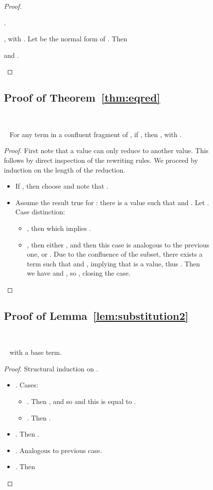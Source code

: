\documentclass{LMCS}
\makeatletter
\newcommand{\recap}[2]{\medskip\noindent{\bf #1 \ref{#2}.}~}
\def\mynobreakpar{\par\nobreak\@afterheading}
\makeatother
\begin{document}
\begin{figure}
{\begin{proof}
\begin{myenumerate}
\begin{itemize}
	  
	  
	  
	  
	  .
      \end{itemize}

    \item , with . Let  be the normal form of . Then
      
      
      and
      .
      \qedhere
  \end{myenumerate}
\end{proof}

\subsection{Proof of Theorem~\ref{thm:eqred}}\label{proof:eqred}~
\mynobreakpar
\recap{Theorem}{thm:eqred}
For any term  in a confluent fragment of , if , then , with .
\begin{proof}
  First note that a value can only reduce to another value. This
  follows by direct inspection of the rewriting rules.
We proceed by induction on the length of the reduction.
  \begin{itemize}
    \item If , then choose  and note that
      .
    \item Assume the result true for : there is a value
       such that  and . Let
      . Case distinction:
      \begin{itemize}
	\item , then  which implies
	  .
	\item , then either , and then this
	  case is analogous to the previous one, or . Due to
	  the confluence of the subset, there exists a term  such that
	   and , implying that  is a
	  value, thus . Then we have  and
	  , so , closing the case.\qedhere
      \end{itemize}
  \end{itemize}
\end{proof}


\subsection{Proof of Lemma~\ref{lem:substitution2}}\label{proof:substitution2}~

\recap{Lemma}{lem:substitution2}
 with  a base term.
\begin{proof}
  Structural induction on .
  \begin{itemize}
    \item . Cases:
      \begin{itemize}
	\item . Then , and so  and this is equal to .
	\item . Then .
      \end{itemize}
    \item . Then .
    \item . Analogous to previous case.
    \item . Then 
      

\end{itemize}
\end{proof}}
\end{figure}
\end{document}

